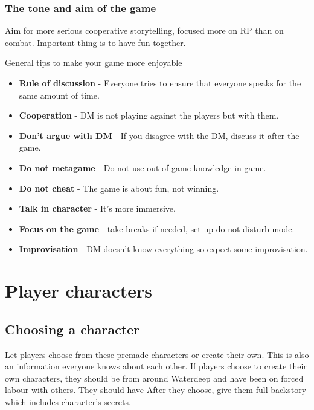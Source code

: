\documentclass[10pt,onecolumn,twoside,openany,bg=full,layout=true]{dndbook}
\begin{document}
\subsection*{The tone and aim of the game}
Aim for more serious cooperative storytelling, focused more on RP than on combat.
Important thing is to have fun together.

  \begin{DndComment}{General tips to make your game more enjoyable}
    \begin{itemize}
      \item \textbf{Rule of discussion} - Everyone tries to ensure that everyone speaks for the same amount of time.
      \item \textbf{Cooperation} - DM is not playing against the players but with them.
      \item \textbf{Don't argue with DM} - If you disagree with the DM, discuss it after the game.
      \item \textbf{Do not metagame} - Do not use out-of-game knowledge in-game.
      \item \textbf{Do not cheat} - The game is about fun, not winning.
      \item \textbf{Talk in character} - It's more immersive.
      \item \textbf{Focus on the game} - take breaks if needed, set-up do-not-disturb mode.
      \item \textbf{Improvisation} - DM doesn't know everything so expect some improvisation.
    \end{itemize}
  \end{DndComment}
\vfill
\pagebreak

\onecolumn
\chapter{Player characters}\label{ch:player-characters}
\section{Choosing a character}\label{sec:choosing-a-character}
Let players choose from these premade characters or create their own.
This is also an information everyone knows about each other.
If players choose to create their own characters, they should be from around Waterdeep and have been on forced labour with others.
They should have
After they choose, give them full backstory which includes character's secrets.

\end{document}
